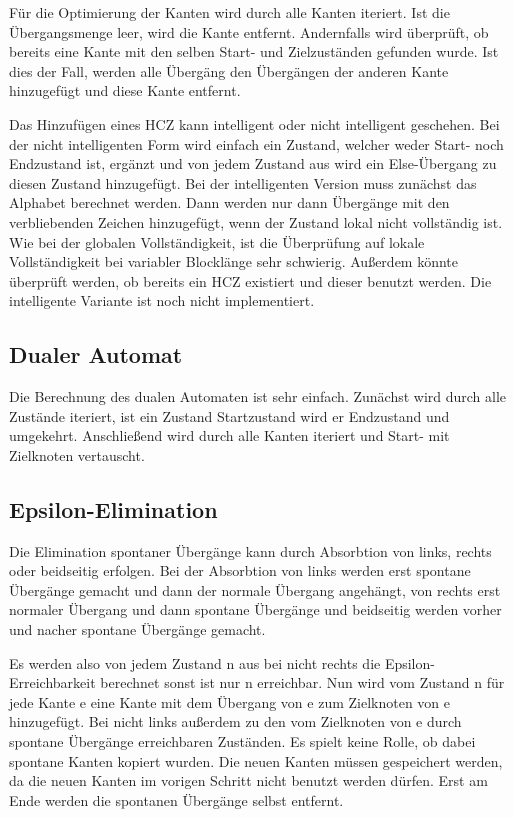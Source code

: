 Für die Optimierung der Kanten wird durch alle Kanten iteriert. Ist die Übergangsmenge leer, wird die Kante entfernt. Andernfalls wird überprüft, ob bereits eine Kante mit den selben Start- und Zielzuständen gefunden wurde. Ist dies der Fall, werden alle Übergäng den Übergängen der anderen Kante hinzugefügt und diese Kante entfernt.

Das Hinzufügen eines HCZ kann intelligent oder nicht intelligent geschehen. Bei der nicht intelligenten Form wird einfach ein Zustand, welcher weder Start- noch Endzustand ist, ergänzt und von jedem Zustand aus wird ein Else-Übergang zu diesen Zustand hinzugefügt. Bei der intelligenten Version muss zunächst das Alphabet berechnet werden. Dann werden nur dann Übergänge mit den verbliebenden Zeichen hinzugefügt, wenn der Zustand lokal nicht vollständig ist. Wie bei der globalen Vollständigkeit, ist die Überprüfung auf lokale Vollständigkeit bei variabler Blocklänge sehr schwierig. Außerdem könnte überprüft werden, ob bereits ein HCZ existiert und dieser benutzt werden. Die intelligente Variante ist noch nicht implementiert.
\subsection{Dualer Automat}
Die Berechnung des dualen Automaten ist sehr einfach. Zunächst wird durch alle Zustände iteriert, ist ein Zustand Startzustand wird er Endzustand und umgekehrt. Anschließend wird durch alle Kanten iteriert und Start- mit Zielknoten vertauscht.
\subsection{Epsilon-Elimination}
Die Elimination spontaner Übergänge kann durch Absorbtion von links, rechts oder beidseitig erfolgen. Bei der Absorbtion von links werden erst spontane Übergänge gemacht und dann der normale Übergang angehängt, von rechts erst normaler Übergang und dann spontane Übergänge und beidseitig werden vorher und nacher spontane Übergänge gemacht.

Es werden also von jedem Zustand n aus bei nicht rechts die Epsilon-Erreichbarkeit berechnet sonst ist nur n erreichbar. Nun wird vom Zustand n für jede Kante e eine Kante mit dem Übergang von e zum Zielknoten von e hinzugefügt. Bei nicht links außerdem zu den vom Zielknoten von e durch spontane Übergänge erreichbaren Zuständen. Es spielt keine Rolle, ob dabei spontane Kanten kopiert wurden. Die neuen Kanten müssen gespeichert werden, da die neuen Kanten im vorigen Schritt nicht benutzt werden dürfen. Erst am Ende werden die spontanen Übergänge selbst entfernt.
